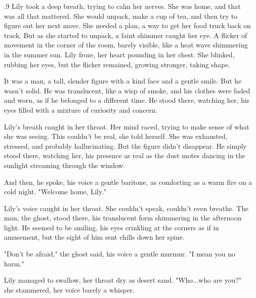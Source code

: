 \documentclass{article}
\newcommand{\Agentsroomzs}{\textsc{Agents' Room$_{ZS}$}}
\begin{document}
\begin{tcolorbox}[colback=white, colframe=gray!30!white, coltitle=black, parskip=5mm, title=
    \textbf{System output: \Agentsroomzs}, breakable]
\begin{spacing}{.9}
Lily took a deep breath, trying to calm her nerves.  She was home, and that was all that mattered.  She would unpack, make a cup of tea, and then try to figure out her next move.  She needed a plan, a way to get her food truck back on track.  But as she started to unpack, a faint shimmer caught her eye.  A flicker of movement in the corner of the room, barely visible, like a heat wave shimmering in the summer sun.  Lily froze, her heart pounding in her chest.  She blinked, rubbing her eyes, but the flicker remained, growing stronger, taking shape.\\\par

It was a man, a tall, slender figure with a kind face and a gentle smile.  But he wasn't solid.  He was translucent, like a wisp of smoke, and his clothes were faded and worn, as if he belonged to a different time.  He stood there, watching her, his eyes filled with a mixture of curiosity and concern.\\\par

Lily's breath caught in her throat.  Her mind raced, trying to make sense of what she was seeing.  This couldn't be real, she told herself.  She was exhausted, stressed, and probably hallucinating.  But the figure didn't disappear.  He simply stood there, watching her, his presence as real as the dust motes dancing in the sunlight streaming through the window.\\\par

And then, he spoke, his voice a gentle baritone, as comforting as a warm fire on a cold night.  "Welcome home, Lily."\\\par

Lily's voice caught in her throat.  She couldn't speak, couldn't even breathe.  The man, the ghost, stood there, his translucent form shimmering in the afternoon light.  He seemed to be smiling, his eyes crinkling at the corners as if in amusement, but the sight of him sent chills down her spine.\\\par

"Don't be afraid," the ghost said, his voice a gentle murmur.  "I mean you no harm."\\\par

Lily managed to swallow, her throat dry as desert sand.  "Who...who are you?" she stammered, her voice barely a whisper.\\\par


\end{spacing}
\end{tcolorbox}
\end{document}
